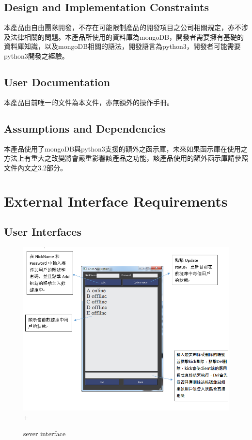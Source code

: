 \documentclass{scrreprt}
\begin{document}
\begin{CJK}{UTF8}{bkai}
\section{Design and Implementation Constraints}
本產品由自由團隊開發，不存在可能限制產品的開發項目之公司相關規定，亦不涉及法律相關的問題。本產品所使用的資料庫為mongoDB，開發者需要擁有基礎的資料庫知識，以及mongoDB相關的語法，開發語言為python3，開發者可能需要python3開發之經驗。

\section{User Documentation}
本產品目前唯一的文件為本文件，亦無額外的操作手冊。

\section{Assumptions and Dependencies}

本產品使用了mongoDB與python3支援的額外之函示庫，未來如果函示庫在使用之方法上有重大之改變將會嚴重影響該產品之功能，該產品使用的額外函示庫請參照文件內文之3.2部分。





\chapter{External Interface Requirements}

\section{User Interfaces}
\begin{figure}[h]
\begin{center}
\includegraphics[width=15cm]{interface1.png}
+\end{center}
\caption{sever interface}
\label{fig:2}
\end{figure}


\end{CJK}
\end{document}
